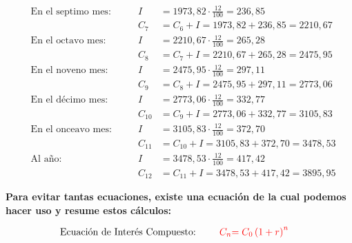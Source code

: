 \documentclass[12pt]{examdesign}
\theoremstyle{plain}
\theoremstyle{definition}
\theoremstyle{remark}
\begin{document}
\begin{shortanswer}[title={Leemos el material de consulta y realizamos las actividades propuestas.}, rearrange=no]
\begin{question}
\begin{answer}
\begin{enumerate}
\begin{align*}
    	    		    \\[0.2cm]
    	    		    &\mbox{En el septimo mes: }    &&&                   I&=  1973,82\cdot \frac{12}{100} = 236,85
    	    		    \\
    	    		    &                              &&&               C_{7}&=C_{6}+I = 1973,82 +  236,85  = 2210,67
    	    		    \\[0.2cm]
    	    		    &\mbox{En el octavo mes: }     &&&                   I&=  2210,67\cdot \frac{12}{100} = 265,28
    	    		    \\
    	    		    &                              &&&               C_{8}&=C_{7}+I = 2210,67 + 265,28 = 2475,95
    	    		    \\[0.2cm]
    	    		    &\mbox{En el noveno mes: }     &&&                   I&=2475,95\cdot \frac{12}{100} = 297,11
    	    		    \\
    	    		    &                              &&&               C_{9}&=C_{8}+I = 2475,95 + 297,11  = 2773,06
    	    		    \\[0.2cm]
    	    		    &\mbox{En el décimo mes: }     &&&                   I&=2773,06\cdot \frac{12}{100} = 332,77 
    	    		    \\
    	    		    &                              &&&              C_{10}&=C_{9}+I = 2773,06 + 332,77 = 3105,83
    	    		    \\[0.2cm]
    	    		    &\mbox{En el onceavo mes: }    &&&                   I&=3105,83\cdot \frac{12}{100} = 372,70
    	    		    \\
    	    		    &                              &&&              C_{11}&=C_{10}+I = 3105,83 + 372,70  = 3478,53
    	    		    \\[0.2cm]
    	    		    &\mbox{Al año: }               &&&                   I&=3478,53\cdot \frac{12}{100} = 417,42
    	    		    \\
    	    		    &                              &&&              C_{12}&=C_{11}+I = 3478,53 + 417,42  = 3895,95 
    	    		\end{align*}
    	    		
    	    		\textbf{Para evitar tantas ecuaciones, existe una ecuación de la cual podemos hacer uso y resume estos cálculos:}
    	    		
    	    		\begin{align}
    	    		    &\mbox{Ecuación de Interés Compuesto: }    &&&\textcolor{red}{C_{n}} &\textcolor{red}{= C_{0}\left( 1+r\right)^{n}}
    	    		\end{align}
    	    		

\end{enumerate}
\end{answer}
\end{question}
\end{shortanswer}
\end{document}
